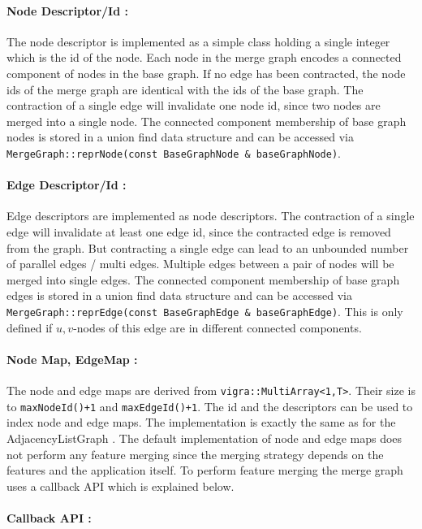 \paragraph{Node Descriptor/Id :}
The node descriptor is implemented as a simple class
holding a single integer which is the id 
of the node.
Each node in the merge graph encodes a connected
component of nodes in the base graph.
If no edge has been contracted, the node ids
of the merge graph are identical with the ids 
of the base graph.
The contraction of a single edge will invalidate
one node id, since two nodes are merged into a single 
node.
The connected component membership of base graph
nodes is stored in a union find data structure 
and can be accessed via \lstinline{MergeGraph::reprNode(const BaseGraphNode & baseGraphNode)}.


\paragraph{Edge Descriptor/Id :}
Edge descriptors are implemented as node descriptors.
The contraction of a single edge will invalidate
at least one edge id, since the contracted edge is removed
from the graph.
But contracting a single edge can lead to an
unbounded number of parallel edges / multi edges.
Multiple edges between a pair of nodes will be merged
into single edges.
The connected component membership of base graph
edges is stored in a union find data structure 
and can be accessed via \lstinline{MergeGraph::reprEdge(const BaseGraphEdge & baseGraphEdge)}.
This is only defined if $u,v$-nodes of this edge are in different connected components.



\paragraph{Node Map, EdgeMap :} 
The node and edge maps are derived from \lstinline{vigra::MultiArray<1,T>}.
Their size is to \lstinline{maxNodeId()+1} and  \lstinline{maxEdgeId()+1}.
The id and the descriptors can be used to index node and edge maps.
The implementation is exactly the same as for the AdjacencyListGraph .
The default implementation of node and edge maps does not perform 
any feature merging since the merging strategy depends on the
features and the application itself.
To perform feature merging the merge graph uses a callback API which is explained below.


\paragraph{Callback API :}

